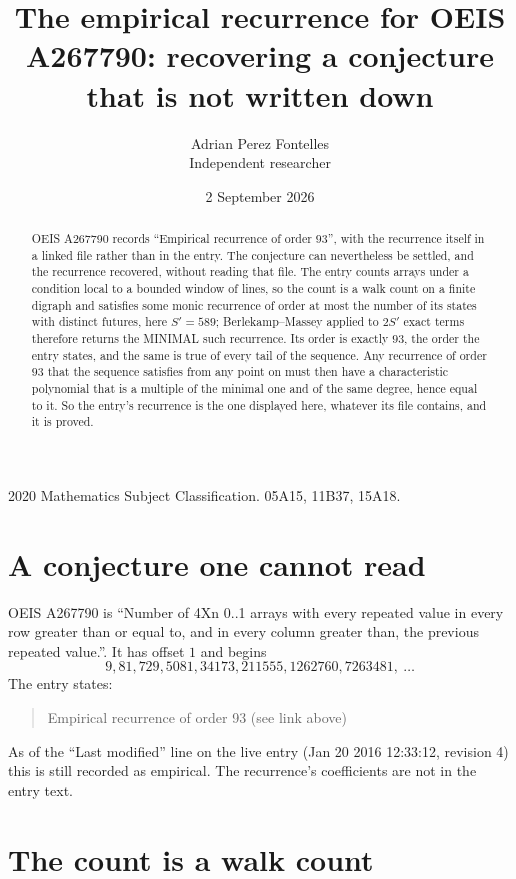 \documentclass[11pt,a4paper]{article}
\title{The empirical recurrence for OEIS A267790: recovering a conjecture that is not written down}
\author{Adrian Perez Fontelles\\ \small Independent researcher}
\date{2 September 2026}
\theoremstyle{plain}
\theoremstyle{definition}
\begin{document}
\maketitle

\begin{abstract}
OEIS A267790 records ``Empirical recurrence of order $93$'', with the recurrence itself in a
linked file rather than in the entry. The conjecture can nevertheless be settled, and the
recurrence recovered, without reading that file. The entry counts arrays under a condition
local to a bounded window of lines, so the count is a walk count on a finite digraph and
satisfies some monic recurrence of order at most the number of its states with distinct
futures, here $S'=589$; Berlekamp--Massey applied to $2S'$ exact
terms therefore returns the MINIMAL such recurrence. Its order is exactly $93$, the order
the entry states, and the same is true of every tail of the sequence. Any recurrence of order
$93$ that the sequence satisfies from any point on must then have a characteristic
polynomial that is a multiple of the minimal one and of the same degree, hence equal to it. So
the entry's recurrence is the one displayed here, whatever its file contains, and it is
proved.
\end{abstract}

\noindent\small 2020 Mathematics Subject Classification. 05A15, 11B37, 15A18.\normalsize

\section{A conjecture one cannot read}

OEIS A267790 is ``Number of 4Xn 0..1 arrays with every repeated value in every row greater than or equal to, and in every column greater than, the previous repeated value.''. It has offset $1$ and begins
\[
9, 81, 729, 5081, 34173, 211555, 1262760, 7263481,\ \dots
\]
The entry states:
\begin{quote}
Empirical recurrence of order 93 (see link above)
\end{quote}
As of the ``Last modified'' line on the live entry (Jan 20 2016 12:33:12, revision 4) this is still
recorded as empirical. The recurrence's coefficients are not in the entry text.

\section{The count is a walk count}
\end{document}

